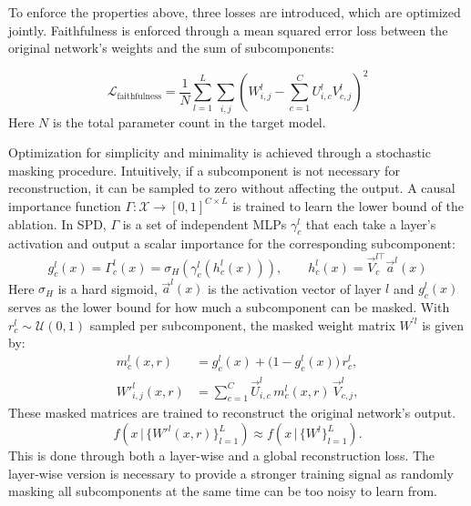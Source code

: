 \documentclass{article}
\begin{document}
To enforce the properties above, three losses are introduced, which are optimized jointly.
Faithfulness is enforced through a mean squared error loss between the original network's weights and the sum of subcomponents:

\begin{equation}
    \mathcal{L}_{\text{faithfulness}} = \frac{1}{N} \sum_{l=1}^{L}\sum_{i,j} \left( W_{i,j}^{l} - \sum_{c=1}^{C} U^{l}_{i,c}V^{l}_{c,j} \right)^{2}  
\end{equation}
Here $N$ is the total parameter count in the target model.

Optimization for simplicity and minimality is achieved through a
stochastic masking procedure. Intuitively, if a subcomponent is not
necessary for reconstruction, it can be sampled to zero without affecting the output.
A causal importance function
$\Gamma: \mathcal{X} \to [0,1]^{C \times L}$ is trained to learn the
lower bound of the ablation. In SPD, $\Gamma$ is a set
of independent MLPs $\gamma^l_c$ that each take a layer's activation
and output a scalar importance for the corresponding subcomponent:
\begin{equation}
g^{l}_{c}(x) = \Gamma^l_c(x) = \sigma_{H}(\gamma^{l}_{c}(h^{l}_{c}(x))), \qquad h^{l}_{c}(x) = \vec{V}_{c}^{l\top} \vec{a}^l(x)
\end{equation}
Here $\sigma_{H}$ is a hard sigmoid, $\vec{a}^l(x)$ is the
activation vector of layer $l$ and $g_c^{l}(x)$ serves as the lower bound for how much a subcomponent can be masked. With $r^l_{c} \sim \mathcal{U}(0, 1)$ sampled per subcomponent, the masked weight matrix $W^{'l}$ is given by:
\begin{equation}
\begin{aligned}
    m_{c}^l(x, r) &= g^{l}_{c}(x) + \bigl(1 - g^{l}_{c}(x)\bigr)\, r^l_{c}, \\
    W'^{l}_{i,j}(x, r)  &= \sum_{c=1}^{C} \vec{U}_{i,c}^{l}\, m_{c}^l(x, r)\, \vec{V}_{c,j}^{l},
\end{aligned}
\end{equation}
These masked matrices are trained to reconstruct the original network's output.
\begin{equation}
    f\!\left(x \,\big|\, \{W'^{l}(x, r)\}_{l=1}^{L}\right)
    \approx
    f\!\left(x \,\big|\, \{W^{l}\}_{l=1}^{L}\right).
\end{equation}
This is done through both a layer-wise and a global reconstruction loss. The layer-wise version is necessary to provide a stronger training signal as randomly masking all subcomponents at the same time can be too noisy to learn from.
\end{document}

